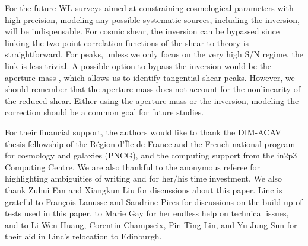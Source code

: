 \documentclass{aa} %
\begin{document}
For the future WL surveys aimed at constraining cosmological parameters with high precision, modeling any possible systematic sources, including the inversion, will be indispensable. For cosmic shear, the inversion can be bypassed since linking the two-point-correlation functions of the shear to theory is straightforward. For peaks, unless we only focus on the very high S/N regime, the link is less trivial. A possible option to bypass the inversion would be the aperture mass \citep{Kaiser_etal_1994, Schneider_1996}, which allows us to identify tangential shear peaks. However, we should remember that the aperture mass does not account for the nonlinearity of the reduced shear. Either using the aperture mass or the inversion, modeling the correction should be a common goal for future studies.


\begin{acknowledgements}
        For their financial support, the authors would like to thank the DIM-ACAV thesis fellowship of the Région d'Île-de-France and the French national program for cosmology and galaxies (PNCG), and the computing support from the in2p3 Computing Centre. We are also thankful to the anonymous referee for highlighting ambiguities of writing and for her/his time investment. We also thank Zuhui Fan and Xiangkun Liu for discussions about this paper. Linc is grateful to François Lanusse and Sandrine Pires for discussions on the build-up of tests used in this paper, to Marie Gay for her endless help on technical issues, and to Li-Wen Huang, Corentin Champseix, Pin-Ting Lin, and Yu-Jung Sun for their aid in Linc's relocation to Edinburgh.
\end{acknowledgements}


\end{document}
